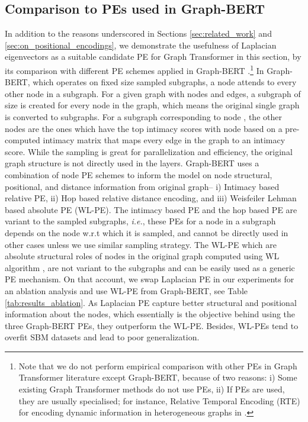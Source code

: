 \documentclass[letterpaper]{article} \usepackage{aaai21}  \usepackage{times}  \usepackage{helvet} \usepackage{courier}  \usepackage[hyphens]{url}  \usepackage{graphicx} \urlstyle{rm} \def\UrlFont{\rm}  \usepackage{natbib}  \usepackage{caption} \usepackage{xcolor}
\begin{document}
\subsection{Comparison to PEs used in Graph-BERT}
In addition to the 
reasons underscored in Sections \ref{sec:related_work} and \ref{sec:on_positional_encodings}, we demonstrate the usefulness of Laplacian eigenvectors as a suitable candidate PE for Graph Transformer in this section, by its comparison with different PE schemes applied in Graph-BERT \cite{zhang2020graph}.\footnote{Note that we do not perform empirical comparison with other PEs in Graph Transformer literature except Graph-BERT, because of two reasons: i) Some existing Graph Transformer methods do not use PEs, ii) If PEs are used, they are usually specialised; for instance, Relative Temporal Encoding (RTE) for encoding dynamic information in heterogeneous graphs in \cite{hu2020heterogeneous}.} In Graph-BERT, which operates on fixed size sampled subgraphs, a node attends to every other node in a subgraph. 
For a given graph  with  nodes and  edges, a subgraph  of size  is created for every node  in the graph, which means the original single graph  is converted to  subgraphs. For a subgraph  corresponding to node , the  other nodes are the ones which have the top  intimacy scores with node  based on a pre-computed intimacy matrix that maps every edge in the graph  to an intimacy score.
While the sampling is great for parallelization and efficiency, the original graph structure is not directly used in the layers. Graph-BERT uses a combination of node PE schemes to inform the model on node structural, positional, and distance information from original graph-- i) Intimacy based relative PE, ii) Hop based relative distance encoding, and iii) Weisfeiler Lehman based absolute PE (WL-PE). The intimacy based PE and the hop based PE are variant to the sampled subgraphs, \textit{i.e.}, these PEs for a node in a subgraph  depends on the node  w.r.t which it is sampled, and cannot be directly used in other cases unless we use similar sampling strategy. The WL-PE which are absolute structural roles of nodes in the original graph computed using WL algorithm \cite{zhang2020graph, niepert2016learning}, are not variant to the subgraphs and can be easily used as a generic PE mechanism. On that account, we swap Laplacian PE in our experiments for an ablation analysis and use WL-PE from Graph-BERT, see Table \ref{tab:results_ablation}.
As Laplacian PE capture better structural and positional information about the nodes, which essentially is the objective behind using the three Graph-BERT PEs, they outperform the WL-PE. Besides, WL-PEs tend to overfit SBM datasets and lead to poor generalization.
\end{document}
